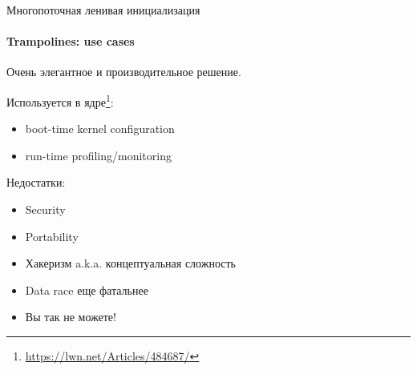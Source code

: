 \begin{frame}[t]{Многопоточная ленивая инициализация}
\framesubtitle{Trampolines: use cases}

Очень элегантное и производительное решение. 

Используется в ядре\footnote{\tiny\url{https://lwn.net/Articles/484687/}}:
\begin{itemize}
    \pause
    \item boot-time kernel configuration
    \pause
    \item run-time profiling/monitoring
\end{itemize}

\pause

Недостатки:
\begin{itemize}
    \pause
    \item Security
    \pause
    \item Portability
    \pause
    \item Хакеризм a.k.a. концептуальная сложность
    \pause
    \item Data race еще фатальнее
    \pause
    \item Вы так не можете!
\end{itemize}

%

\end{frame}

